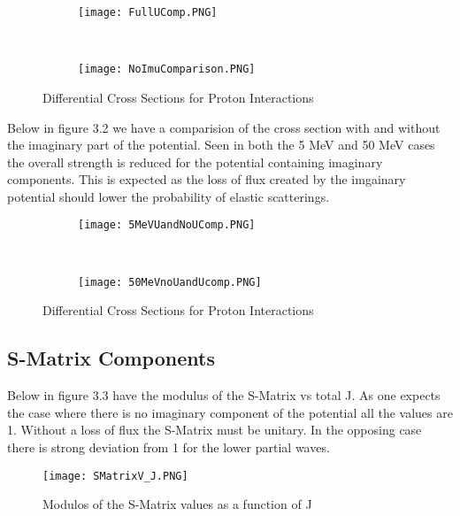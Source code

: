 \documentclass[paper=a4, fontsize=11pt]{scrartcl} %
\numberwithin{equation}{section} %
\numberwithin{figure}{section} %
\numberwithin{table}{section} %
\begin{document}
 \begin{figure}[hbt]
        \centering
        \begin{subfigure}[b!]{0.45\textwidth}
                \texttt{[image: FullUComp.PNG]}
        \end{subfigure}%
        ~ %
\quad
        \begin{subfigure}[b!]{0.45\textwidth}
                \texttt{[image: NoImuComparison.PNG]}
        \end{subfigure}

        \caption{Differential Cross Sections for Proton Interactions}
\end{figure}

Below in figure 3.2 we have a comparision of the cross section with and without the imaginary part of the potential.  Seen in both the 5 MeV and 50 MeV cases the overall strength is reduced for the potential containing imaginary components.  This is expected as the loss of flux created by the imgainary potential should lower the probability of elastic scatterings.  

 \begin{figure}[hbt]
        \centering
        \begin{subfigure}[b!]{0.45\textwidth}
                \texttt{[image: 5MeVUandNoUComp.PNG]}
        \end{subfigure}%
        ~ %
\quad
        \begin{subfigure}[b!]{0.45\textwidth}
                \texttt{[image: 50MeVnoUandUcomp.PNG]}
        \end{subfigure}

        \caption{Differential Cross Sections for Proton Interactions}
\end{figure}
 

\subsection{S-Matrix Components}
Below in figure 3.3 have the modulus of the S-Matrix vs total J.  As one expects the case where there is no imaginary component of the potential all the values are 1.  Without a loss of flux the S-Matrix must be unitary.  In the opposing case there is strong deviation from 1 for the lower partial waves.  
\begin{figure}[hbt]
        \centering
	\texttt{[image: SMatrixV\_J.PNG]}
 \caption{Modulos of the S-Matrix values as a function of J}	
\end{figure}
\end{document}
